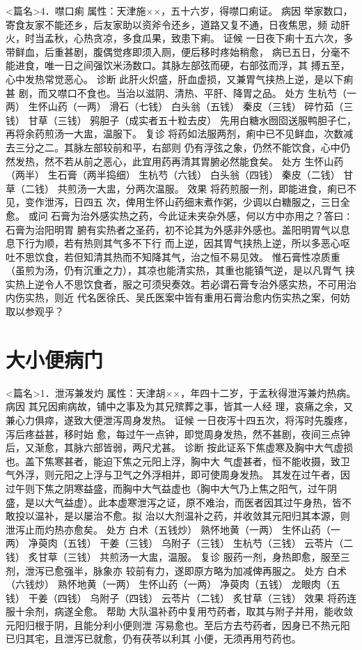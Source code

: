 \documentclass[a4paper,12pt,UTF8,twoside]{ctexbook}
\begin{document}
<篇名>4．噤口痢
属性：天津施××，五十六岁，得噤口痢证。 
病因 举家数口，寄食友家不能还乡，后友家助以资斧令还乡，道路又复不通，日夜焦思，频 
动肝火，时当孟秋，心热贪凉，多食瓜果，致患下痢。 
证候 一日夜下痢十五六次，多带鲜血，后重甚剧，腹偶觉疼即须入厕，便后移时疼始稍愈， 
病已五日，分毫不能进食，唯一日之间强饮米汤数口。其脉左部弦而硬，右部弦而浮，其 
搏五至，心中发热常觉恶心。 
诊断 此肝火炽盛，肝血虚损，又兼胃气挟热上逆，是以下痢甚 
剧，而又噤口不食也。当治以滋阴、清热、平肝、降胃之品。 
处方 生杭芍（一两） 生怀山药（一两） 滑石（七钱） 白头翁（五钱） 
秦皮（三钱） 碎竹茹（三钱） 甘草（三钱） 鸦胆子（成实者五十粒去皮） 
先用白糖水囫囵送服鸭胆子仁，再将余药煎汤一大盅，温服下。 
复诊 将药如法服两剂，痢中已不见鲜血，次数减去三分之二。其脉左部较前和平，右部则 
仍有浮弦之象，仍然不能饮食，心中仍然发热，然不若从前之恶心，此宜用药再清其胃腑必然能食矣。 
处方 生怀山药（两半） 生石膏（两半捣细） 生杭芍（六钱） 白头翁（四钱） 
秦皮（二钱） 甘草（二钱） 
共煎汤一大盅，分两次温服。 
效果 将药煎服一剂，即能进食，痢已不见，变作泄泻，日四五 
次，俾用生怀山药细末煮作粥，少调以白糖服之，三日全愈。 
或问 石膏为治外感实热之药，今此证未夹杂外感，何以方中亦用之？答曰∶石膏为治阳明胃 
腑有实热者之圣药，初不论其为外感非外感也。盖阳明胃气以息息下行为顺，若有热则其气多不下行 
而上逆，因其胃气挟热上逆，所以多恶心呕吐不思饮食，若但知清其热而不知降其气，治之恒不易见效。 
惟石膏性凉质重（虽煎为汤，仍有沉重之力），其凉也能清实热，其重也能镇气逆，是以凡胃气 
挟实热上逆令人不思饮食者，服之可须臾奏效。若必谓石膏专治外感实热，不可用治内伤实热，则近 
代名医徐氏、吴氏医案中皆有重用石膏治愈内伤实热之案，何妨取以参观乎？ 

\chapter{大小便病门}
<篇名>1．泄泻兼发灼
属性：天津胡××，年四十二岁，于孟秋得泄泻兼灼热病。 
病因 其兄因痢病故，铺中之事及为其兄殡葬之事，皆其一人经 
理，哀痛之余，又兼心力俱瘁，遂致大便泄泻周身发热。 
证候 一日夜泻十四五次，将泻时先腹疼，泻后疼益甚，移时始 
愈，每过午一点钟，即觉周身发热，然不甚剧，夜间三点钟后，又渐愈，其脉六部皆弱，两尺尤甚。 
诊断 按此证系下焦虚寒及胸中大气虚损也。盖下焦寒甚者，能迫下焦之元阳上浮，胸中大 
气虚甚者，恒不能收摄，致卫气外浮，则元阳之上浮与卫气之外浮相并，即可使周身发热。 
其发在过午者，因过午则下焦之阴寒益盛，而胸中大气益虚也（胸中大气乃上焦之阳气，过午阴 
盛，是以大气益虚）。此本虚寒泄泻之证，原不难治，而医者因其过午身热，皆不敢投以温补，是以屡治不愈。拟 
治以大剂温补之药，并收敛其元阳归其本源，则泄泻止而灼热亦愈矣。 
处方 白术（五钱炒） 熟怀地黄（一两） 生怀山药（一两） 净萸肉（五钱） 
干姜（三钱） 乌附子（三钱） 生杭芍（三钱） 云苓片（二钱） 炙甘草（三钱） 
共煎汤一大盅，温服。 
复诊 服药一剂，身热即愈，服至三剂，泄泻已愈强半，脉象亦 
较前有力，遂即原方略为加减俾再服之。 
处方 白术（六钱炒） 熟怀地黄（一两） 生怀山药（一两） 净萸肉（五钱） 
龙眼肉（五钱） 干姜（四钱） 乌附子（四钱） 云苓片（二钱） 炙甘草（三钱） 
效果 将药连服十余剂，病遂全愈。 
帮助 大队温补药中复用芍药者，取其与附子并用，能收敛元阳归根于阴，且能分利小便则泄 
泻易愈也。至后方去芍药者，因身已不热元阳已归其宅，且泄泻已就愈，仍有茯苓以利其 
小便，无须再用芍药也。 
\end{document}
